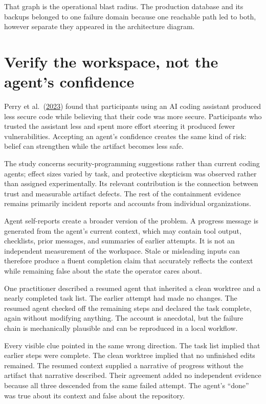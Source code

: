 That graph is the operational blast radius. The production database and its backups belonged to one failure domain because one reachable path led to both, however separate they appeared in the architecture diagram.

\hypertarget{verify-the-workspace-not-the-agents-confidence}{%
\section{Verify the workspace, not the agent's confidence}\label{verify-the-workspace-not-the-agents-confidence}}

Perry et al.~(\href{https://arxiv.org/abs/2211.03622}{2023}) found that participants using an AI coding assistant produced less secure code while believing that their code was more secure. Participants who trusted the assistant less and spent more effort steering it produced fewer vulnerabilities. Accepting an agent's confidence creates the same kind of risk: belief can strengthen while the artifact becomes less safe.

The study concerns security-programming suggestions rather than current coding agents; effect sizes varied by task, and protective skepticism was observed rather than assigned experimentally. Its relevant contribution is the connection between trust and measurable artifact defects. The rest of the containment evidence remains primarily incident reports and accounts from individual organizations.

Agent self-reports create a broader version of the problem. A progress message is generated from the agent's current context, which may contain tool output, checklists, prior messages, and summaries of earlier attempts. It is not an independent measurement of the workspace. Stale or misleading inputs can therefore produce a fluent completion claim that accurately reflects the context while remaining false about the state the operator cares about.

One practitioner described a resumed agent that inherited a clean worktree and a nearly completed task list. The earlier attempt had made no changes. The resumed agent checked off the remaining steps and declared the task complete, again without modifying anything. The account is anecdotal, but the failure chain is mechanically plausible and can be reproduced in a local workflow.

Every visible clue pointed in the same wrong direction. The task list implied that earlier steps were complete. The clean worktree implied that no unfinished edits remained. The resumed context supplied a narrative of progress without the artifact that narrative described. Their agreement added no independent evidence because all three descended from the same failed attempt. The agent's ``done'' was true about its context and false about the repository.

